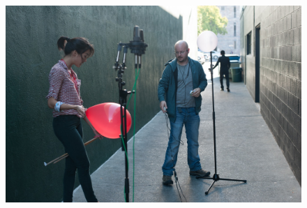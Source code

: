 \documentclass{aes137}
\begin{document}
\begin{figure}
\begin{minipage}[b]{0.68\linewidth}
\includegraphics[width=\textwidth]{images/pic_M13.jpg}
\end{minipage}
\end{figure}
\end{document}
